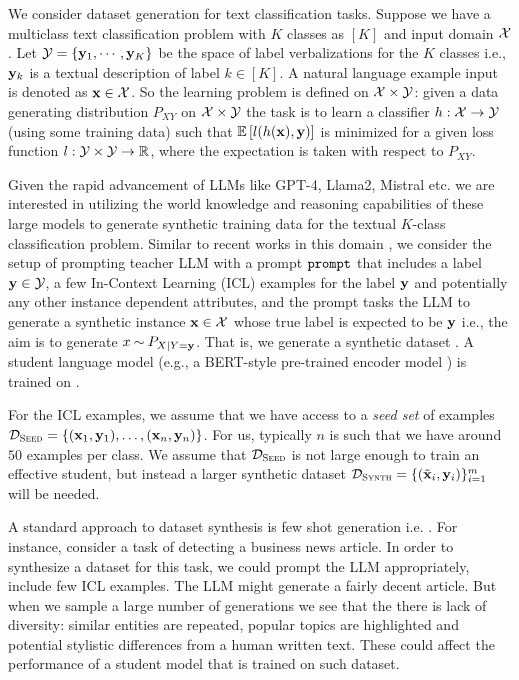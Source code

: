 We consider dataset generation for text classification tasks. Suppose we have a multiclass text classification problem with $K$ classes as $[K]$ and input domain $\mathcal{X}$. Let $\mathcal{Y}=\{\mathbf{y}_1,\cdots,\mathbf{y}_K\}$ be the space of label verbalizations for the $K$ classes i.e., $\mathbf{y}_k$ is a textual description of label $k\in[K]$. A natural language example input is denoted as $\mathbf{x}\in\mathcal{X}$. So the learning problem is defined on $\mathcal{X}\times \mathcal{Y}$: given a data generating distribution $P_{XY}$ on $\mathcal{X}\times \mathcal{Y}$ the task is to learn a classifier $h:\mathcal{X}\to \mathcal{Y}$ (using some training data) such that $\mathbb{E}\left[l(h(\mathbf{x}),\mathbf{y}) \right]$ is minimized for a given loss function $l:\mathcal{Y}\times\mathcal{Y}\to \mathbb{R}$, where the expectation is taken with respect to $P_{XY}$. 

Given the rapid advancement of LLMs like GPT-4, Llama2, Mistral etc. we are interested in utilizing the world knowledge and reasoning capabilities of these large models to generate synthetic training data for the textual $K$-class classification problem. Similar to recent works in this domain \cite{ye2022zerogen,gao2022self,Meng2022GeneratingTD,meng2023tuning,yu2023regen,ye2022progen,yu2024large,guo2024generative}, we consider the setup of prompting teacher LLM with a prompt $\mathtt{prompt}$ that includes a label $\mathbf{y}\in\mathcal{Y}$, a few In-Context Learning (ICL) examples for the label $\mathbf{y}$ and potentially any other instance dependent attributes, and the prompt tasks the LLM to generate a synthetic instance $\mathbf{x}\in \mathcal{X}$ whose true label is expected to be $\mathbf{y}$ i.e., the aim is to generate $x\mathbin{\overset{}{\kern0pt\sim}}P_{X|Y=\mathbf{y}}$. That is, we generate a synthetic dataset \synthd{}. A student language model (e.g., a BERT-style pre-trained encoder model \citep{devlin-etal-2019-bert}) is trained on \synthd{}. 

For the ICL examples, we assume that we have access to a \emph{seed set} of examples $\mathcal{D}_{\textsc{Seed}} = \{(\mathbf{x}_1,\mathbf{y}_1),\ldots,(\mathbf{x}_n,\mathbf{y}_n)\}$. For us, typically $n$ is such that we have around $50$ examples per class. We assume that $\mathcal{D}_{\textsc{Seed}}$ is not large enough to train an effective student, but instead a larger synthetic dataset $\mathcal{D}_{\textsc{Synth}}=\{ (\tilde{\mathbf{x}}_i,\mathbf{y}_i)\}_{i=1}^m$  will be needed.%

A standard approach to dataset synthesis is few shot generation i.e. \fewgen{} \cite{NEURIPS2020_1457c0d6,ye2022progen,Yehudai2024GenieAH}. For instance, consider a task of detecting a business news article. In order to synthesize a dataset for this task, we could prompt the LLM appropriately, include few ICL examples. The LLM might generate a fairly decent article. But when we sample a large number of generations we see that the there is lack of diversity: similar entities are repeated, popular topics are highlighted and potential stylistic differences from a human written text. These could affect the performance of a student model that is trained on such dataset.

